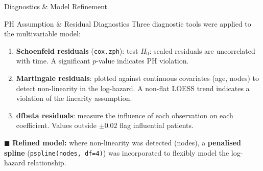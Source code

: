 \documentclass[aspectratio=169, 10pt]{beamer}
\begin{document}
\begin{frame}{Diagnostics \& Model Refinement}
	
	\begin{block}{PH Assumption \& Residual Diagnostics}
		\large
		Three diagnostic tools were applied to the multivariable model:
	\end{block}
	
	\vspace{4pt}
	
	\begin{enumerate}
		\small
		\item \textbf{Schoenfeld residuals} (\texttt{cox.zph}): test
		$H_0$: scaled residuals are uncorrelated with time.
		A significant $p$-value indicates PH violation.
		
		\vspace{4pt}
		\item \textbf{Martingale residuals}: plotted against continuous
		covariates (age, nodes) to detect non-linearity in the
		log-hazard. A non-flat LOESS trend indicates a violation
		of the linearity assumption.
		
		\vspace{4pt}
		\item \textbf{dfbeta residuals}: measure the influence of each
		observation on each coefficient. Values outside $\pm 0.02$
		flag influential patients.
	\end{enumerate}
		\vspace{4pt}
		
	$\blacksquare$ \textbf{Refined model:} where non-linearity was detected
		(nodes), a \textbf{penalised spline}
		(\texttt{pspline(nodes, df=4)}) was incorporated to
		flexibly model the log-hazard relationship.
	
	
\end{frame}
\end{document}
